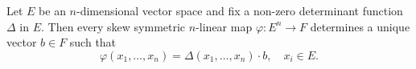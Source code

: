 Let $E$ be an $n$-dimensional vector space and fix a non-zero determinant function $\Delta$ in $E$. Then every skew symmetric $n$-linear map $\varphi: E^n \to F$ determines a unique vector $b \in F$ such that
$$\varphi(x_1, \ldots, x_n) = \Delta(x_1, \ldots, x_n) \cdot b, \quad x_i \in E.$$
